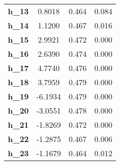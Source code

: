 \documentclass[conference]{IEEEtran}
\begin{document}
\begin{table}[htbp]
\begin{center}
\begin{tabular}{lccc}
\textbf{h\_13}                    &       0.8018  &        0.464     & 0.084  \\
\textbf{h\_14}                    &       1.1200  &        0.467     & 0.016  \\
\textbf{h\_15}                    &       2.9921  &        0.472     & 0.000  \\
\textbf{h\_16}                    &       2.6390  &        0.474     & 0.000  \\
\textbf{h\_17}                    &       4.7740  &        0.476     & 0.000  \\
\textbf{h\_18}                    &       3.7959  &        0.479     & 0.000  \\
\textbf{h\_19}                    &      -6.1934  &        0.479     & 0.000  \\
\textbf{h\_20}                    &      -3.0551  &        0.478     & 0.000  \\
\textbf{h\_21}                    &      -1.8269  &        0.472     & 0.000  \\
\textbf{h\_22}                    &      -1.2875  &        0.467     & 0.006  \\
\textbf{h\_23}                    &      -1.1679  &        0.464     & 0.012  \\
\bottomrule
\end{tabular}
\end{center}
\end{table}




\vspace{12pt}
\end{document}
